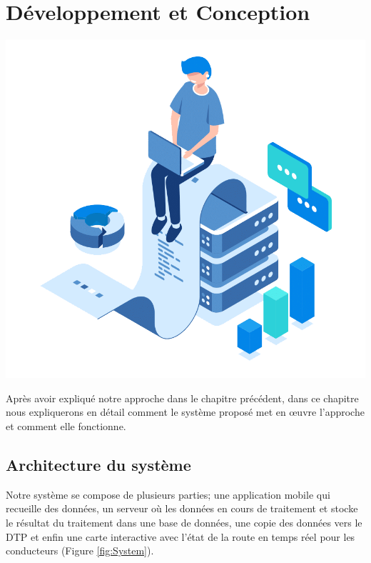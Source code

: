 \chapter{Développement et Conception}
\label{chapter:dev}

\label{chapitre4}
		
		\includegraphics [width=1 \linewidth, height=0.8\textheight, keepaspectratio] {Images/chapterFigures/chFour.png}
		
	
		
		\newpage

Après avoir expliqué notre approche dans le chapitre précédent, dans ce chapitre nous expliquerons en détail comment le système proposé met en œuvre l'approche et comment elle fonctionne.

\section{Architecture du système}

Notre système se compose de plusieurs parties; une application mobile qui recueille des données, un serveur où les données en cours de traitement et stocke le résultat du traitement dans une base de données, une copie des données vers le DTP et enfin une carte interactive avec l'état de la route en temps réel pour les conducteurs (Figure \ref{fig:System}).

